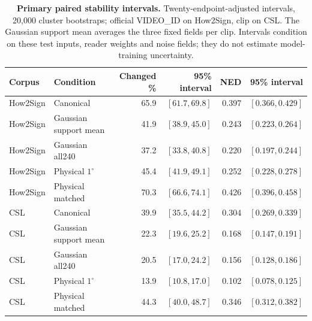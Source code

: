 \begin{table}[t]
\centering\small
\caption{\textbf{Primary paired stability intervals.} Twenty-endpoint-adjusted intervals, 20,000 cluster bootstraps; official VIDEO\_ID on How2Sign, clip on CSL. The Gaussian support mean averages the three fixed fields per clip. Intervals condition on these test inputs, reader weights and noise fields; they do not estimate model-training uncertainty.}\label{tab:signstabilityintervals}
\begin{tabular}{@{}llrrrr@{}}\toprule
Corpus&Condition&Changed \%&95\% interval&NED&95\% interval\\\midrule
How2Sign&Canonical&65.9&$[61.7,69.8]$&0.397&$[0.366,0.429]$\\
How2Sign&Gaussian support mean&41.9&$[38.9,45.0]$&0.243&$[0.223,0.264]$\\
How2Sign&Gaussian all240&37.2&$[33.8,40.8]$&0.220&$[0.197,0.244]$\\
How2Sign&Physical $1^\circ$&45.4&$[41.9,49.1]$&0.252&$[0.228,0.278]$\\
How2Sign&Physical matched&70.3&$[66.6,74.1]$&0.426&$[0.396,0.458]$\\
CSL&Canonical&39.9&$[35.5,44.2]$&0.304&$[0.269,0.339]$\\
CSL&Gaussian support mean&22.3&$[19.6,25.2]$&0.168&$[0.147,0.191]$\\
CSL&Gaussian all240&20.5&$[17.0,24.2]$&0.156&$[0.128,0.186]$\\
CSL&Physical $1^\circ$&13.9&$[10.8,17.0]$&0.102&$[0.078,0.125]$\\
CSL&Physical matched&44.3&$[40.0,48.7]$&0.346&$[0.312,0.382]$\\
\bottomrule\end{tabular}\end{table}
